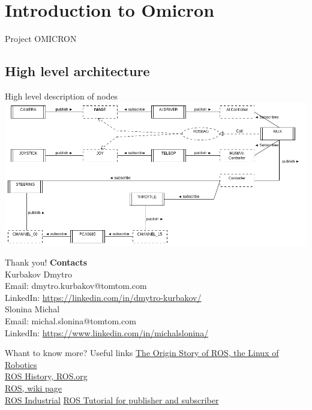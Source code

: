 \documentclass{beamer}
\begin{document}
\section{Introduction to Omicron}
\begin{frame}
\begin{center}
\Huge Project OMICRON
\end{center}
\end{frame}

\subsection{High level architecture}
\begin{frame}{High level description of nodes}
\includegraphics[scale=0.35]{images/omicron_graph} 
\end{frame}

\begin{frame}{Thank you!}
\textbf{Contacts}\\
\vfill
Kurbakov Dmytro\\
Email: dmytro.kurbakov@tomtom.com\\
LinkedIn: \url{https://linkedin.com/in/dmytro-kurbakov/}\\
\vfill
Slonina Michal\\
Email: michal.slonina@tomtom.com\\
LinkedIn: \url{https://www.linkedin.com/in/michalslonina/}\\
\end{frame}


\begin{frame}{Whant to know more? Useful links}
\href{https://spectrum.ieee.org/automaton/robotics/robotics-software/the-origin-story-of-ros-the-linux-of-robotics}{The Origin Story of ROS, the Linux of Robotics}\\
\href{https://www.ros.org/history/}{ROS History, ROS.org}\\
\href{https://en.wikipedia.org/wiki/Robot_Operating_System}{ROS, wiki page}\\
\href{http://wiki.ros.org/Industrial/Tutorials}{ROS Industrial}
\href{https://wiki.ros.org/ROS/Tutorials/WritingPublisherSubscriber\%28python\%29}{ROS Tutorial for publisher and subscriber}
\end{frame}
\end{document}
